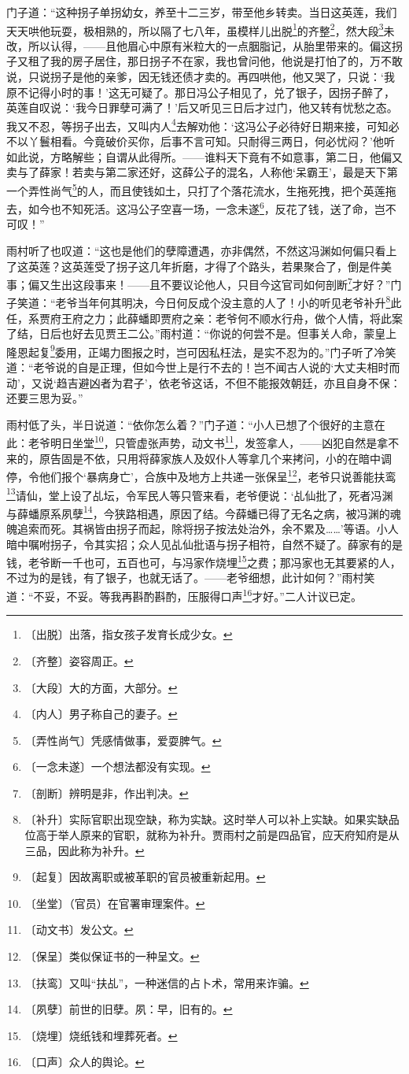 \documentclass[12pt,UTF-8,openany]{ctexbook}
\begin{document}
\begin{large}
    门子道：“这种拐子单拐幼女，养至十二三岁，带至他乡转卖。当日这英莲，我们天天哄他玩耍，极相熟的，所以隔了七八年，虽模样儿出脱\footnote{〔出脱〕出落，指女孩子发育长成少女。}的齐整\footnote{〔齐整〕姿容周正。}，然大段\footnote{〔大段〕大的方面，大部分。}未改，所以认得，——且他眉心中原有米粒大的一点胭脂记，从胎里带来的。偏这拐子又租了我的房子居住，那日拐子不在家，我也曾问他，他说是打怕了的，万不敢说，只说拐子是他的亲爹，因无钱还债才卖的。再四哄他，他又哭了，只说：‘我原不记得小时的事！’这无可疑了。那日冯公子相见了，兑了银子，因拐子醉了，英莲自叹说：‘我今日罪孽可满了！’后又听见三日后才过门，他又转有忧愁之态。我又不忍，等拐子出去，又叫内人\footnote{〔内人〕男子称自己的妻子。}去解劝他：‘这冯公子必待好日期来接，可知必不以丫鬟相看。今竟破价买你，后事不言可知。只耐得三两日，何必忧闷？’他听如此说，方略解些；自谓从此得所。——谁料天下竟有不如意事，第二日，他偏又卖与了薛家！若卖与第二家还好，这薛公子的混名，人称他‘呆霸王’，最是天下第一个弄性尚气\footnote{〔弄性尚气〕凭感情做事，爱耍脾气。}的人，而且使钱如土，只打了个落花流水，生拖死拽，把个英莲拖去，如今也不知死活。这冯公子空喜一场，一念未遂\footnote{〔一念未遂〕一个想法都没有实现。}，反花了钱，送了命，岂不可叹！”
    
    雨村听了也叹道：“这也是他们的孽障遭遇，亦非偶然，不然这冯渊如何偏只看上了这英莲？这英莲受了拐子这几年折磨，才得了个路头，若果聚合了，倒是件美事；偏又生出这段事来！——且不要议论他人，只目今这官司如何剖断\footnote{〔剖断〕辨明是非，作出判决。}才好？”门子笑道：“老爷当年何其明决，今日何反成个没主意的人了！小的听见老爷补升\footnote{〔补升〕实际官职出现空缺，称为实缺。这时举人可以补上实缺。如果实缺品位高于举人原来的官职，就称为补升。贾雨村之前是四品官，应天府知府是从三品，因此称为补升。}此任，系贾府王府之力；此薛蟠即贾府之亲：老爷何不顺水行舟，做个人情，将此案了结，日后也好去见贾王二公。”雨村道：“你说的何尝不是。但事关人命，蒙皇上隆恩起复\footnote{〔起复〕因故离职或被革职的官员被重新起用。}委用，正竭力图报之时，岂可因私枉法，是实不忍为的。”门子听了冷笑道：“老爷说的自是正理，但如今世上是行不去的！岂不闻古人说的‘大丈夫相时而动’，又说‘趋吉避凶者为君子’，依老爷这话，不但不能报效朝廷，亦且自身不保：还要三思为妥。”
    
    雨村低了头，半日说道：“依你怎么着？”门子道：“小人已想了个很好的主意在此：老爷明日坐堂\footnote{〔坐堂〕（官员）在官署审理案件。}，只管虚张声势，动文书\footnote{〔动文书〕发公文。}，发签拿人，——凶犯自然是拿不来的，原告固是不依，只用将薛家族人及奴仆人等拿几个来拷问，小的在暗中调停，令他们报个‘暴病身亡’，合族中及地方上共递一张保呈\footnote{〔保呈〕类似保证书的一种呈文。}，老爷只说善能扶鸾\footnote{〔扶鸾〕又叫“扶乩”，一种迷信的占卜术，常用来诈骗。}请仙，堂上设了乩坛，令军民人等只管来看，老爷便说：‘乩仙批了，死者冯渊与薛蟠原系夙孽\footnote{〔夙孽〕前世的旧孽。夙：早，旧有的。}，今狭路相遇，原因了结。今薛蟠已得了无名之病，被冯渊的魂魄追索而死。其祸皆由拐子而起，除将拐子按法处治外，余不累及……’等语。小人暗中嘱咐拐子，令其实招；众人见乩仙批语与拐子相符，自然不疑了。薛家有的是钱，老爷断一千也可，五百也可，与冯家作烧埋\footnote{〔烧埋〕烧纸钱和埋葬死者。}之费；那冯家也无其要紧的人，不过为的是钱，有了银子，也就无话了。——老爷细想，此计如何？”雨村笑道：“不妥，不妥。等我再斟酌斟酌，压服得口声\footnote{〔口声〕众人的舆论。}才好。”二人计议已定。
    

\end{large}
\end{document}

